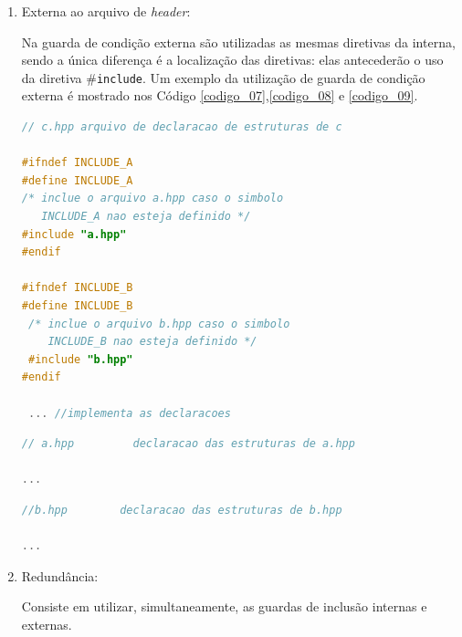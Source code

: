 \begin{enumerate}
\item Externa ao arquivo de \textit{header}:
 
Na  guarda de condição externa  são utilizadas as mesmas diretivas da interna,
 sendo a única diferença é a localização das diretivas: elas antecederão o uso
 da diretiva \#\texttt{include}. Um exemplo da utilização de guarda de condição 
externa é mostrado nos Código \ref{codigo_07},\ref{codigo_08} e
 \ref{codigo_09}\cite{ref42}.


\begin{lstlisting}[language=C++,frame=single,captionpos=b,caption={
									Arquivo c.hpp 
                                    contendo guardas de inclusão externa},
                                                            label=codigo_07]
// c.hpp arquivo de declaracao de estruturas de c

#ifndef INCLUDE_A
#define INCLUDE_A
/* inclue o arquivo a.hpp caso o simbolo 
   INCLUDE_A nao esteja definido */
#include "a.hpp"
#endif
        
#ifndef INCLUDE_B
#define INCLUDE_B
 /* inclue o arquivo b.hpp caso o simbolo 
    INCLUDE_B nao esteja definido */
 #include "b.hpp"
#endif

 ... //implementa as declaracoes

\end{lstlisting}

\begin{lstlisting}[language=C++,frame=single,captionpos=b,caption={
										   Arquivo a.hpp 
                                           com guarda de inclusão externa},
                                                            label=codigo_08]
// a.hpp         declaracao das estruturas de a.hpp

...

\end{lstlisting}

\begin{lstlisting}[language=C++,frame=single,captionpos=b,caption={
										   Arquivo b.hpp
                                           com guarda de inclusão externa},
                                                            label=codigo_09]
//b.hpp        declaracao das estruturas de b.hpp

...

\end{lstlisting}


\item Redundância:\label{redundancia_melhor}

Consiste em utilizar, simultaneamente, as guardas de inclusão internas e 
externas. 


\end{enumerate}
